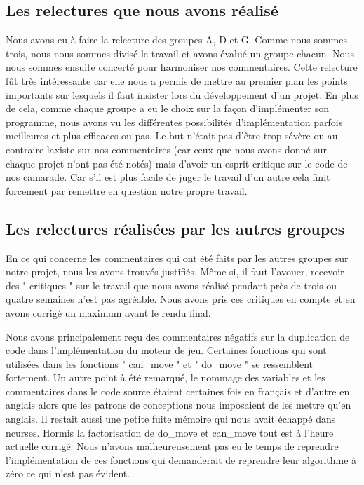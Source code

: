 \documentclass[12pt]{article}
\begin{document}
\subsection{Les relectures que nous avons réalisé}
Nous avons eu à faire la relecture des groupes A, D et G. Comme nous sommes
trois, nous nous sommes divisé le travail et avons évalué un groupe
chacun. Nous nous sommes ensuite concerté pour harmoniser nos commentaires.
Cette relecture fût très intéressante car elle nous a permis de mettre au
premier plan les points importants sur lesquels il faut insister lors du
développement d'un projet. En plus de cela, comme chaque groupe a eu le choix
sur la façon d'implémenter son programme, nous avons vu les différentes
possibilités d'implémentation parfois meilleures et plus efficaces ou pas. Le
but n'était pas d'être trop sévère ou au contraire laxiste sur nos
commentaires (car ceux que nous avons donné sur chaque projet n'ont pas été
notés) mais d'avoir un esprit critique sur le code de nos camarade. Car s'il est plus facile
de juger le travail d'un autre cela finit forcement par remettre en question notre
propre travail.
\subsection{Les relectures réalisées par les autres groupes}
\label{notre_etude}
En ce qui concerne les commentaires qui ont été faits par les autres groupes
sur notre projet, nous les avons trouvés justifiés. Même si, il faut
l'avouer, recevoir des " critiques " sur le travail que nous avons
réalisé pendant près de trois ou quatre semaines n'est pas agréable. Nous avons pris ces critiques
en compte et en avons corrigé un maximum avant le rendu final. 
\par Nous avons principalement reçu des commentaires négatifs sur la
duplication de code dans l'implémentation du moteur de jeu. Certaines fonctions
qui sont utilisées dans les fonctions " can\_move " et " do\_move " se
ressemblent fortement. Un autre point à été remarqué, le nommage des
variables et les commentaires dans le code source étaient certaines fois en
français et d'autre en anglais alors que les patrons de conceptions nous
imposaient de les mettre qu'en anglais. Il restait aussi une petite fuite mémoire
qui nous avait échappé dans ncurses. Hormis la factorisation de do\_move et can\_move tout
est à l'heure actuelle corrigé. Nous n'avons malheureusement pas eu le temps de
reprendre l'implémentation de ces fonctions qui demanderait de reprendre
leur algorithme à zéro ce qui n'est pas évident.
\end{document}
